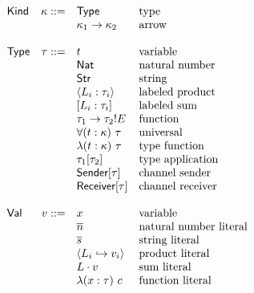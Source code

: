 \documentclass[12pt]{article}
\begin{document}
\[
\begin{array}{l r l l}
\textsf{Kind} & \kappa ::= & \textsf{Type}                     & \text{type} \\
              &            & \kappa_1 \rightarrow \kappa_2     & \text{arrow} \\
\\
\textsf{Type} &   \tau ::= & t                                 & \text{variable} \\
              &            & \textsf{Nat}                      & \text{natural number} \\
              &            & \textsf{Str}                      & \text{string} \\
              &            & \langle L_i : \tau_i \rangle      & \text{labeled product} \\
              &            & [ L_i : \tau_i ]                  & \text{labeled sum} \\
              &            & \tau_1 \rightarrow \tau_2!E       & \text{function} \\
              &            & \forall (t : \kappa) \ \tau       & \text{universal} \\
              &            & \lambda (t : \kappa) \ \tau       & \text{type function} \\
              &            & \tau_1[\tau_2]                    & \text{type application} \\
              &            & \textsf{Sender}[\tau]             & \text{channel sender} \\
              &            & \textsf{Receiver}[\tau]           & \text{channel receiver} \\
\\
\textsf{Val}  &      v ::= & x                                 & \text{variable} \\
              &            & \overline{n}                      & \text{natural number literal} \\
              &            & \overline{s}                      & \text{string literal} \\
              &            & \langle
                             L_i \hookrightarrow v_i
                             \rangle                           & \text{product literal} \\
              &            & L \cdot v                         & \text{sum literal} \\
              &            & \lambda (x : \tau) \ c            & \text{function literal} \\

\end{array}\]
\end{document}
